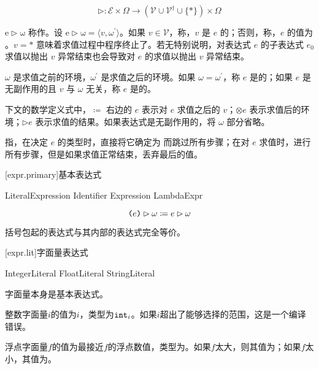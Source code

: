 $$ \mathrm{\rhd}: \mathcal{E} \times \Omega \rightarrow (\mathcal{V} \cup \mathcal{V}^\dag \cup \{\ast\}) \times \Omega $$

\pnum
$\mathrm{e \rhd \omega}$ 称作。设 $\mathrm{e \rhd \omega} = \langle v, \omega^\prime \rangle$。如果 $v \in \mathcal{V}$，称，$v$ 是 $e$ 的；否则，称，$e$ 的值为 。$v = \ast$ 意味着求值过程中程序终止了。若无特别说明，对表达式 $e$ 的子表达式 $e_0$ 求值以抛出 $v$ 异常结束也会导致对 $e$ 的求值以抛出 $v$ 异常结束。

\pnum
$\omega$ 是求值之前的环境，$\omega^\prime$ 是求值之后的环境。如果 $\omega = \omega^\prime$，称 $e$ 是的；如果 $e$ 是无副作用的且 $v$ 与 $\omega$ 无关，称 $e$ 是的。

\pnum
下文的数学定义式中，$\coloneqq$ 右边的 $e$ 表示对 $e$ 求值之后的 $v$；$\otimes e$ 表示求值后的环境；$\rhd e$ 表示求值的结果。如果表达式是无副作用的，将 $\omega$ 部分省略。

\pnum
{}指，在决定 $e$ 的类型时，直接将它确定为  而跳过所有步骤；在对 $e$ 求值时，进行所有步骤，但是如果求值正常结束，丢弃最后的值。

[expr.primary]{基本表达式}

\begin{bnf}
 \br
    LiteralExpression \br
    Identifier \br
    \terminal{(} Expression \terminal{)} \br
    LambdaExpr
\end{bnf}

$$ \texttt{(}e\texttt{)} \rhd \omega \coloneqq e \rhd \omega $$

\pnum
括号包起的表达式与其内部的表达式完全等价。

[expr.lit]{字面量表达式}

\begin{bnf}
 \br
    IntegerLiteral \br
    FloatLiteral \br
    StringLiteral \br
     \br
     \br
     \br
    \terminal{()}
\end{bnf}

\pnum
字面量本身是基本表达式。

\pnum
整数字面量$i$的值为$i$，类型为$\texttt{int}_i$。如果$i$超出了能够选择的范围，这是一个编译错误。

\pnum
浮点字面量$f$的值为最接近$f$的浮点数值，类型为。如果$f$太大，则其值为；如果$f$太小，其值为。

